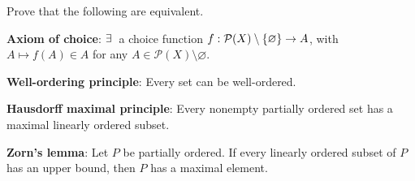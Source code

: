 \begin{problem}
    Prove that the following are equivalent. 
    \begin{thmenum}
        \item \textbf{Axiom of choice}: $\exists\:$ a choice function 
        $f:\mathcal{P}(X)\setminus\left\{ {\varnothing} \right\}\to A$, with 
        $A\mapsto f(A)\in A$ for any $A\in\mathcal{P}(X)\setminus
        \varnothing$.
        \item \textbf{Well-ordering principle}: Every set can be 
        well-ordered.
        \item \textbf{Hausdorff maximal principle}: Every nonempty 
        partially ordered set has a maximal linearly ordered 
        subset.
        \item \textbf{Zorn's lemma}: Let $P$ be partially ordered. 
        If every linearly ordered subset of $P$ has an upper 
        bound, then $P$ has a maximal element.  
    \end{thmenum}
\end{problem}
